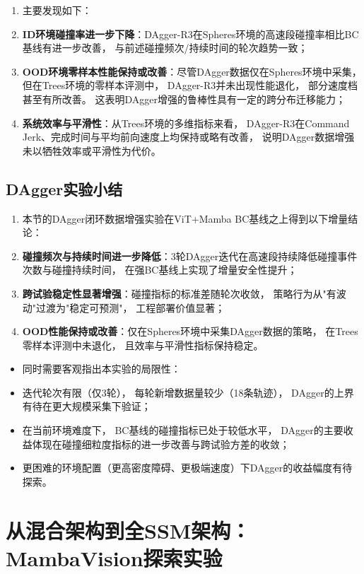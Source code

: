 \begin{enumerate}
\item 主要发现如下：
\item \textbf{ID环境碰撞率进一步下降}：DAgger-R3在Spheres环境的高速段碰撞率相比BC基线有进一步改善，
与前述碰撞频次/持续时间的轮次趋势一致；
 \item \textbf{OOD环境零样本性能保持或改善}：尽管DAgger数据仅在Spheres环境中采集，
但在Trees环境的零样本评测中，
DAgger-R3并未出现性能退化，
部分速度档甚至有所改善。
这表明DAgger增强的鲁棒性具有一定的跨分布迁移能力；
 \item \textbf{系统效率与平滑性}：从Trees环境的多维指标来看，
DAgger-R3在Command Jerk、完成时间与平均前向速度上均保持或略有改善，
说明DAgger数据增强未以牺牲效率或平滑性为代价。
 \end{enumerate}

\subsection{DAgger实验小结}

\begin{enumerate}
\item 本节的DAgger闭环数据增强实验在ViT+Mamba BC基线之上得到以下增量结论：
\item \textbf{碰撞频次与持续时间进一步降低}：3轮DAgger迭代在高速段持续降低碰撞事件次数与碰撞持续时间，
在强BC基线上实现了增量安全性提升；
 \item \textbf{跨试验稳定性显著增强}：碰撞指标的标准差随轮次收敛，
策略行为从"有波动"过渡为"稳定可预测"，
工程部署价值显著；
 \item \textbf{OOD性能保持或改善}：仅在Spheres环境中采集DAgger数据的策略，
在Trees零样本评测中未退化，
且效率与平滑性指标保持稳定。
 \end{enumerate}

\begin{itemize}
\item 同时需要客观指出本实验的局限性：
\item 迭代轮次有限（仅3轮），
每轮新增数据量较少（18条轨迹），
DAgger的上界有待在更大规模采集下验证；
 \item 在当前环境难度下，
BC基线的碰撞指标已处于较低水平，
DAgger的主要收益体现在碰撞细粒度指标的进一步改善与跨试验方差的收敛；
 \item 更困难的环境配置（更高密度障碍、更极端速度）下DAgger的收益幅度有待探索。
 \end{itemize}


\section{从混合架构到全SSM架构：MambaVision探索实验}

